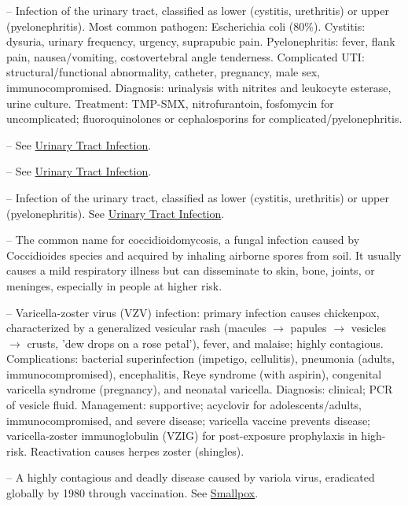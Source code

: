 -- Infection of the urinary tract, classified as lower (cystitis, urethritis) or upper (pyelonephritis). Most common pathogen: Escherichia coli (80\%). Cystitis: dysuria, urinary frequency, urgency, suprapubic pain. Pyelonephritis: fever, flank pain, nausea/vomiting, costovertebral angle tenderness. Complicated UTI: structural/functional abnormality, catheter, pregnancy, male sex, immunocompromised. Diagnosis: urinalysis with nitrites and leukocyte esterase, urine culture. Treatment: TMP-SMX, nitrofurantoin, fosfomycin for uncomplicated; fluoroquinolones or cephalosporins for complicated/pyelonephritis.

-- See \hyperlink{Urinary Tract Infection}{Urinary Tract Infection}.

-- See \hyperlink{Urinary Tract Infection}{Urinary Tract Infection}.

-- Infection of the urinary tract, classified as lower (cystitis, urethritis) or upper (pyelonephritis). See \hyperlink{Urinary Tract Infection}{Urinary Tract Infection}.

-- The common name for coccidioidomycosis, a fungal infection caused by Coccidioides species and acquired by inhaling airborne spores from soil. It usually causes a mild respiratory illness but can disseminate to skin, bone, joints, or meninges, especially in people at higher risk.

-- Varicella-zoster virus (VZV) infection: primary infection causes chickenpox, characterized by a generalized vesicular rash (macules $\rightarrow$ papules $\rightarrow$ vesicles $\rightarrow$ crusts, 'dew drops on a rose petal'), fever, and malaise; highly contagious. Complications: bacterial superinfection (impetigo, cellulitis), pneumonia (adults, immunocompromised), encephalitis, Reye syndrome (with aspirin), congenital varicella syndrome (pregnancy), and neonatal varicella. Diagnosis: clinical; PCR of vesicle fluid. Management: supportive; acyclovir for adolescents/adults, immunocompromised, and severe disease; varicella vaccine prevents disease; varicella-zoster immunoglobulin (VZIG) for post-exposure prophylaxis in high-risk. Reactivation causes herpes zoster (shingles).

-- A highly contagious and deadly disease caused by variola virus, eradicated globally by 1980 through vaccination. See \hyperlink{Smallpox}{Smallpox}.

